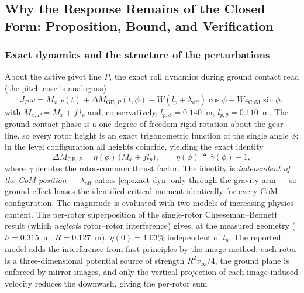 \subsection{Why the Response Remains of the Closed Form: Proposition, Bound, and Verification}
\label{sec:fidelity}

\subsubsection{Exact dynamics and the structure of the perturbations}
\label{sec:fid-setup}

About the active pivot line $P$, the exact roll dynamics during ground
contact read (the pitch case is analogous)
\begin{equation}
  J_P\,\dot\omega
  = M_{x,P}(t) + \Delta M_{\mathrm{GE},P}(t,\phi)
    - W\!\left(l_p+\lambda_{\mathrm{off}}\right)\cos\phi
    + W z_{\mathrm{CoM}}\sin\phi ,
  \label{eq:exact-dyn}
\end{equation}
with $M_{x,P} = M_x + f\,l_p$ and, conservatively, $l_{p,\phi}=0.140$~m,
$l_{p,\theta}=0.110$~m. The ground-contact phase is a one-degree-of-freedom
rigid rotation about the gear line, so every rotor height is an exact
trigonometric function of the single angle $\phi$; in the level
configuration all heights coincide, yielding the exact identity
\begin{equation}
  \Delta M_{\mathrm{GE},P} = \eta(\phi)\,\bigl(M_x + f l_p\bigr),
  \qquad \eta(\phi) \triangleq \bar\gamma(\phi)-1,
  \label{eq:ge-identity}
\end{equation}
where $\bar\gamma$ denotes the rotor-common thrust factor. The identity
is \emph{independent of the CoM position} — $\lambda_{\mathrm{off}}$
enters \eqref{eq:exact-dyn} only through the gravity arm — so ground
effect biases the identified critical moment identically for every CoM
configuration. The magnitude is evaluated with two models of increasing physics
content. The per-rotor superposition of the single-rotor
Cheeseman--Bennett result (which \emph{neglects} rotor--rotor
interference) gives, at the measured geometry ($h=0.315$~m,
$R=0.127$~m), $\eta(0) = 1.03\%$ independent of $l_p$. The reported
model adds the interference from first principles by the image method:
each rotor is a three-dimensional potential source of strength
$R^2 v_\infty/4$, the ground plane is enforced by mirror images, and
only the vertical projection of each image-induced velocity reduces
the downwash, giving the per-rotor sum
